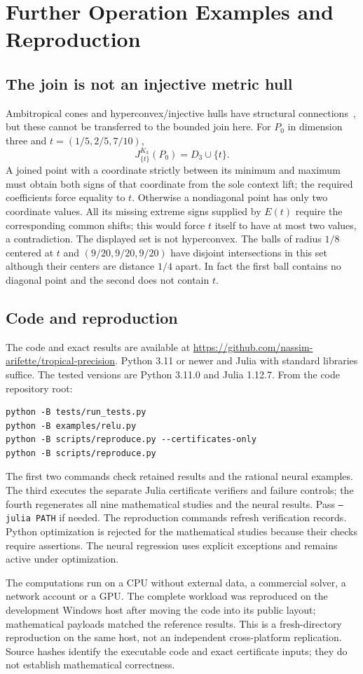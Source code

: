 \section{Further Operation Examples and Reproduction}\label{app:operations}
\subsection{The join is not an injective metric hull}
Ambitropical cones and hyperconvex/injective hulls have structural connections~\cite{akian2023}, but these cannot be transferred to the bounded join here. For $P_0$ in dimension three and $t=(1/5,2/5,7/10)$,
\[
J_{\{t\}}^{K_3}(P_0)=D_3\cup\{t\}.
\]
A joined point with a coordinate strictly between its minimum and maximum must obtain both signs of that coordinate from the sole context lift; the required coefficients force equality to $t$. Otherwise a nondiagonal point has only two coordinate values. All its missing extreme signs supplied by $E(t)$ require the corresponding common shifts; this would force $t$ itself to have at most two values, a contradiction. The displayed set is not hyperconvex. The balls of radius $1/8$ centered at $t$ and $(9/20,9/20,9/20)$ have disjoint intersections in this set although their centers are distance $1/4$ apart. In fact the first ball contains no diagonal point and the second does not contain $t$.


\subsection{Code and reproduction}
The code and exact results are available at
\url{https://github.com/nassim-arifette/tropical-precision}.
Python 3.11 or newer and Julia with standard libraries suffice. The tested versions are Python 3.11.0 and Julia 1.12.7. From the code repository root:
\begin{verbatim}
python -B tests/run_tests.py
python -B examples/relu.py
python -B scripts/reproduce.py --certificates-only
python -B scripts/reproduce.py
\end{verbatim}
The first two commands check retained results and the rational neural examples. The third executes the separate Julia certificate verifiers and failure controls; the fourth regenerates all nine mathematical studies and the neural results. Pass \texttt{--julia PATH} if needed. The reproduction commands refresh verification records. Python optimization is rejected for the mathematical studies because their checks require assertions. The neural regression uses explicit exceptions and remains active under optimization.

The computations run on a CPU without external data, a commercial solver, a network account or a GPU. The complete workload was reproduced on the development Windows host after moving the code into its public layout; mathematical payloads matched the reference results. This is a fresh-directory reproduction on the same host, not an independent cross-platform replication. Source hashes identify the executable code and exact certificate inputs; they do not establish mathematical correctness.
